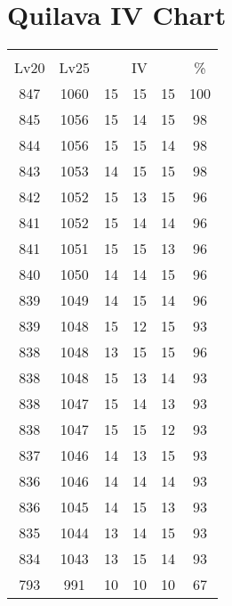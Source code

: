 \documentclass{article}%
\begin{document}
%
\normalsize%
\section{Quilava IV Chart}%
\label{sec:Quilava IV Chart}%
\renewcommand{\arraystretch}{1.5}%
\begin{tabular}{|c|c|c|c|c|c|}%
\hline%
\multicolumn{6}{|c|}{\textcolor{white}{ 
\linebreak{Quilava}
}%
\cellcolor{black}}\\%
\multicolumn{1}{|c}{Lv20}&\multicolumn{1}{c|}{Lv25}&\multicolumn{3}{c|}{IV}&\multicolumn{1}{|c|}{\%}\\%
\hline%
\rowcolor{color100}%
847&1060&15&15&15&100\\%
\hline%
\rowcolor{color98}%
845&1056&15&14&15&98\\%
\hline%
\rowcolor{color98}%
844&1056&15&15&14&98\\%
\hline%
\rowcolor{color98}%
843&1053&14&15&15&98\\%
\hline%
\rowcolor{color96}%
842&1052&15&13&15&96\\%
\hline%
\rowcolor{color96}%
841&1052&15&14&14&96\\%
\hline%
\rowcolor{color96}%
841&1051&15&15&13&96\\%
\hline%
\rowcolor{color96}%
840&1050&14&14&15&96\\%
\hline%
\rowcolor{color96}%
839&1049&14&15&14&96\\%
\hline%
\rowcolor{color93}%
839&1048&15&12&15&93\\%
\hline%
\rowcolor{color96}%
838&1048&13&15&15&96\\%
\hline%
\rowcolor{color93}%
838&1048&15&13&14&93\\%
\hline%
\rowcolor{color93}%
838&1047&15&14&13&93\\%
\hline%
\rowcolor{color93}%
838&1047&15&15&12&93\\%
\hline%
\rowcolor{color93}%
837&1046&14&13&15&93\\%
\hline%
\rowcolor{color93}%
836&1046&14&14&14&93\\%
\hline%
\rowcolor{color93}%
836&1045&14&15&13&93\\%
\hline%
\rowcolor{color93}%
835&1044&13&14&15&93\\%
\hline%
\rowcolor{color93}%
834&1043&13&15&14&93\\%
\hline%
\rowcolor{color91}%
793&991&10&10&10&67\\%
\end{tabular}

%
\end{document}
